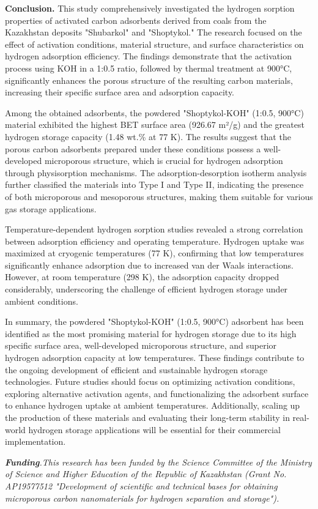 \begin{multicols}{2}
{\bfseries Conclusion.} This study comprehensively investigated the
hydrogen sorption properties of activated carbon adsorbents derived from
coals from the Kazakhstan deposits "Shubarkol" and "Shoptykol." The
research focused on the effect of activation conditions, material
structure, and surface characteristics on hydrogen adsorption
efficiency. The findings demonstrate that the activation process using
KOH in a 1:0.5 ratio, followed by thermal treatment at 900°C,
significantly enhances the porous structure of the resulting carbon
materials, increasing their specific surface area and adsorption
capacity.

Among the obtained adsorbents, the powdered "Shoptykol-KOH" (1:0.5,
900°C) material exhibited the highest BET surface area (926.67 m²/g) and
the greatest hydrogen storage capacity (1.48 wt.\% at 77 K). The results
suggest that the porous carbon adsorbents prepared under these
conditions possess a well-developed microporous structure, which is
crucial for hydrogen adsorption through physisorption mechanisms. The
adsorption-desorption isotherm analysis further classified the materials
into Type I and Type II, indicating the presence of both microporous and
mesoporous structures, making them suitable for various gas storage
applications.

Temperature-dependent hydrogen sorption studies revealed a strong
correlation between adsorption efficiency and operating temperature.
Hydrogen uptake was maximized at cryogenic temperatures (77 K),
confirming that low temperatures significantly enhance adsorption due to
increased van der Waals interactions. However, at room temperature (298
K), the adsorption capacity dropped considerably, underscoring the
challenge of efficient hydrogen storage under ambient conditions.

In summary, the powdered "Shoptykol-KOH" (1:0.5, 900°C) adsorbent has
been identified as the most promising material for hydrogen storage due
to its high specific surface area, well-developed microporous structure,
and superior hydrogen adsorption capacity at low temperatures. These
findings contribute to the ongoing development of efficient and
sustainable hydrogen storage technologies. Future studies should focus
on optimizing activation conditions, exploring alternative activation
agents, and functionalizing the adsorbent surface to enhance hydrogen
uptake at ambient temperatures. Additionally, scaling up the production
of these materials and evaluating their long-term stability in
real-world hydrogen storage applications will be essential for their
commercial implementation.

\emph{{\bfseries Funding}.This research has been funded by the Science
Committee of the Ministry of Science and Higher Education of the
Republic of Kazakhstan (Grant No. AP19577512 "Development of scientific
and technical bases for obtaining microporous carbon nanomaterials for
hydrogen separation and storage").}
\end{multicols}


